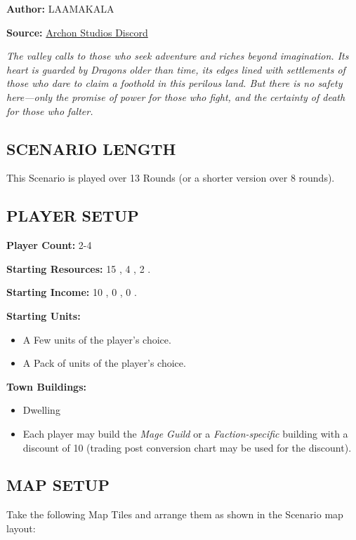 
\begin{multicols*}{2}

\textbf{Author:} LAAMAKALA

\textbf{Source:} \href{https://discord.com/channels/740870068178649108/1239631918643941509}{Archon Studios Discord}

\textit{The valley calls to those who seek adventure and riches beyond imagination. Its heart is guarded by Dragons older than time, its edges lined with settlements of those who dare to claim a foothold in this perilous land. But there is no safety here—only the promise of power for those who fight, and the certainty of death for those who falter.}

\subsection*{\MakeUppercase{Scenario Length}}
This Scenario is played over 13 Rounds (or a shorter version over 8 rounds).

\subsection*{\MakeUppercase{Player Setup}}
\textbf{Player Count:} 2-4

\textbf{Starting Resources:} 15 , 4 , 2 .

\textbf{Starting Income:} 10 , 0 , 0 .

\textbf{Starting Units:}
\begin{itemize}
  \item A Few  units of the player's choice.
  \item A Pack of  units of the player's choice.
\end{itemize}

\textbf{Town Buildings:} 
\begin{itemize}
  \item {} Dwelling
  \item Each player may build the \textit{Mage Guild} or a \textit{Faction-specific} building with a discount of 10  (trading post conversion chart may be used for the discount).
\end{itemize}

\subsection*{\MakeUppercase{Map Setup}}
Take the following Map Tiles and arrange them as shown in the Scenario map layout:


\end{multicols*}
